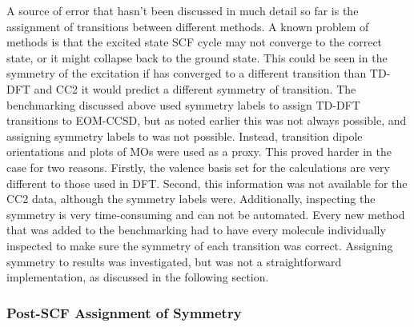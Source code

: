A source of error that hasn't been discussed in much detail so far is
the assignment of transitions between different methods. A known problem of \dscf
methods is that the excited state SCF cycle may not converge to the correct state,
or it might collapse back to the ground state. This could be seen in the symmetry
of the excitation if \dscf has converged to a different transition than TD-DFT and
CC2 it would predict a  different symmetry of transition. The benchmarking discussed
above used symmetry labels to assign TD-DFT transitions to EOM-CCSD, but as noted
earlier this was not always possible, and assigning symmetry labels to \dscf was 
not possible. Instead, transition dipole orientations and plots of MOs were used
as a proxy. This proved harder in the \dxtb case for two reasons. Firstly, the
valence basis set for the \dxtb calculations are very different to those used in
DFT. Second, this information was not available for the CC2 data, although
the symmetry labels were. Additionally, inspecting the symmetry is very time-consuming
and can not be automated. Every new method that was added to the benchmarking
had to have every molecule individually inspected to make sure the symmetry
of each transition was correct. Assigning symmetry to \dscf results was investigated,
but was not a straightforward implementation, as discussed in the following section.
 
\subsubsection{Post-SCF Assignment of Symmetry}
\label{subsubsec:post_scf_symmetry}

